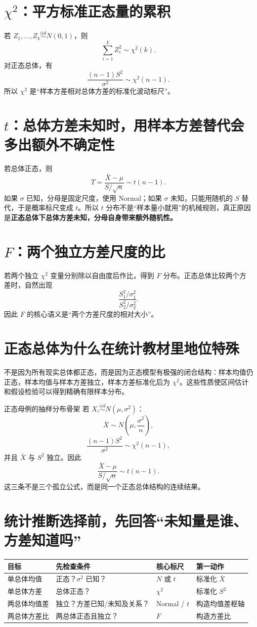 \documentclass[11pt,a4paper,openany]{ctexbook}
\newcommand{\key}[1]{\textbf{\color{deep}#1}}
\begin{document}
\section{\texorpdfstring{$\chi^2$}{Chi2}：平方标准正态量的累积}
若 $Z_1,\dots,Z_k\overset{iid}{\sim}N(0,1)$，则
\[
\sum_{i=1}^kZ_i^2\sim\chi^2(k).
\]
对正态总体，有
\[
\frac{(n-1)S^2}{\sigma^2}\sim\chi^2(n-1).
\]
所以 $\chi^2$ 是“样本方差相对总体方差的标准化波动标尺”。

\section{\texorpdfstring{$t$}{t}：总体方差未知时，用样本方差替代会多出额外不确定性}
若总体正态，则
\[
T=\frac{\bar X-\mu}{S/\sqrt n}\sim t(n-1).
\]
如果 $\sigma$ 已知，分母是固定尺度，使用 Normal；如果 $\sigma$ 未知，只能用随机的 $S$ 替代，于是概率标尺变成 $t$。所以 $t$ 分布不是“样本量小就用”的机械规则，真正原因是\key{正态总体下总体方差未知，分母自身带来额外随机性。}

\section{\texorpdfstring{$F$}{F}：两个独立方差尺度的比}
若两个独立 $\chi^2$ 变量分别除以自由度后作比，得到 $F$ 分布。正态总体比较两个方差时，自然出现
\[
\frac{S_1^2/\sigma_1^2}{S_2^2/\sigma_2^2}.
\]
因此 $F$ 的核心语义是“两个方差尺度的相对大小”。

\section{正态总体为什么在统计教材里地位特殊}
不是因为所有现实总体都正态，而是因为正态模型有极强的闭合结构：样本均值仍正态，样本均值与样本方差独立，样本方差标准化后为 $\chi^2$。这些性质使区间估计和假设检验可以得到精确有限样本分布。

\begin{examplebox}{正态母例的抽样分布骨架}
若 $X_i\overset{iid}{\sim}N(\mu,\sigma^2)$：
\[
\bar X\sim N\left(\mu,\frac{\sigma^2}{n}\right),
\]
\[
\frac{(n-1)S^2}{\sigma^2}\sim\chi^2(n-1),
\]
并且 $\bar X$ 与 $S^2$ 独立。因此
\[
\frac{\bar X-\mu}{S/\sqrt n}\sim t(n-1).
\]
这三条不是三个孤立公式，而是同一个正态总体结构的连续结果。
\end{examplebox}

\section{统计推断选择前，先回答“未知量是谁、方差知道吗”}
\begin{longtable}{L{2.8cm}L{3.6cm}L{3.6cm}L{\dimexpr\linewidth-10.52cm\relax}}
\toprule
\textbf{目标} & \textbf{先检查条件} & \textbf{核心标尺} & \textbf{第一动作}\\
\midrule
单总体均值 & 正态？$\sigma^2$ 已知？ & $N$ 或 $t$ & 标准化 $\bar X$\\
单总体方差 & 总体正态？ & $\chi^2$ & 标准化 $S^2$\\
两总体均值差 & 独立？方差已知/未知及关系？ & Normal / $t$ & 构造均值差枢轴\\
两总体方差比 & 两总体正态且独立？ & $F$ & 构造方差比\\
\bottomrule
\end{longtable}
\end{document}
